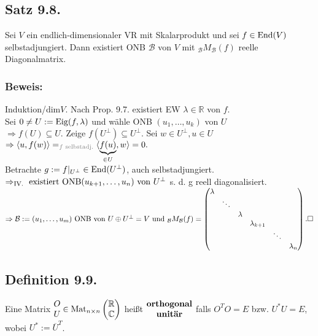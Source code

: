 \documentclass[a4paper, 12pt]{extarticle}
\newcommand{\vecTwo}[2] {
	\left( 
	\begin{matrix}
		#1\\
		#2
	\end{matrix} 
	\right)
}
\newcommand{\skalar}[2] {
	\langle #1, #2\rangle
}
\newcommand{\tn}[1]{\textnormal {#1}}
\newcommand{\transp}[2][50]{\color{black!#1}#2}
\begin{document}
\subsection*{Satz 9.8.}
Sei $V$ ein endlich-dimensionaler VR mit Skalarprodukt und sei $f\in \tn{End}(V)$ selbstadjungiert. Dann existiert ONB $\mathcal{B}$ von $V$ mit ${_{\mathcal{B}}}M_{\mathcal{B}}(f)$ reelle Diagonalmatrix.
\subsubsection*{Beweis:}
Induktion/dim$V$. Nach Prop. 9.7. existiert EW $\lambda \in \mathbb{R}$ von $f$.\\
Sei $0\neq U:=\tn{Eig}(f, \lambda)$ und wähle ONB $(u_1, \dots, u_k)$ von $U$\\
$\Rightarrow f(U) \subseteq U.$ Zeige $f(U^{\perp}) \subseteq U^\perp.$ Sei $w \in U^\perp, u\in U$\\
$\Rightarrow \skalar{u}{f(w)} =_{\transp{f \tn{ selbstadj.}}} \skalar{\underbrace{f(u)}_{\in U}}{w} = 0.$\\
Betrachte $g:=f|_{U^\perp} \in \tn{End}(U^\perp)$, auch selbstadjungiert.\\
$\Rightarrow_{\tn{IV.}} \tn{ existiert ONB} (u_{k+1}, \dots, u_n) \tn{ von } U^\perp$ s. d. g reell diagonalisiert.\\
$\Rightarrow \mathcal{B}:=(u_1, \dots, u_m) \tn{ ONB von } U \oplus U^\perp = V \tn{ und } {_{\mathcal{B}}}M_{\mathcal{B}}(f) = \left(\begin{matrix}
	\lambda & & & & & \\
	 & \ddots & & & & \\
	 & & \lambda & & & \\
	 & & & \lambda_{k+1} & & \\
	 & & & & \ddots & \\
	 & & & & & \lambda_n\\
\end{matrix}\right). \Box$
\subsection*{Definition 9.9.}
Eine Matrix $\begin{matrix}O\\U\end{matrix} \in \tn{Mat}_{n \times n}\vecTwo{\mathbb{R}}{\mathbb{C}}$ heißt $\begin{matrix}\tn{\textbf{orthogonal}}\\\tn{\textbf{unitär}}\end{matrix}$ falls $O^TO=E$ bzw. $U^*U=E$, wobei $U^*:= \overline{U}^T$.
\end{document}
